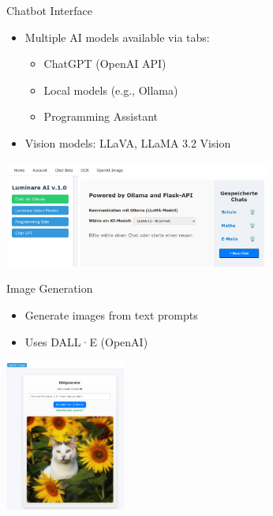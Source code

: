 \documentclass{beamer}
\begin{document}
\begin{frame}{Chatbot Interface}
  \begin{itemize}
    \item Multiple AI models available via tabs:
    \begin{itemize}
      \item ChatGPT (OpenAI API)
      \item Local models (e.g., Ollama)
      \item Programming Assistant
    \end{itemize}
    \item Vision models: LLaVA, LLaMA 3.2 Vision
  \end{itemize}
  \vspace{0.5cm}
  \centering
  \includegraphics[height=3.5cm]{Chat-Bot-Navigation-Bar.png} %
\end{frame}

\begin{frame}{Image Generation}
  \begin{itemize}
    \item Generate images from text prompts
    \item Uses DALL·E (OpenAI)
  \end{itemize}
  \vspace{0.5cm}
  \centering
  \includegraphics[height=5cm]{image-generation.png} %
\end{frame}
\end{document}
